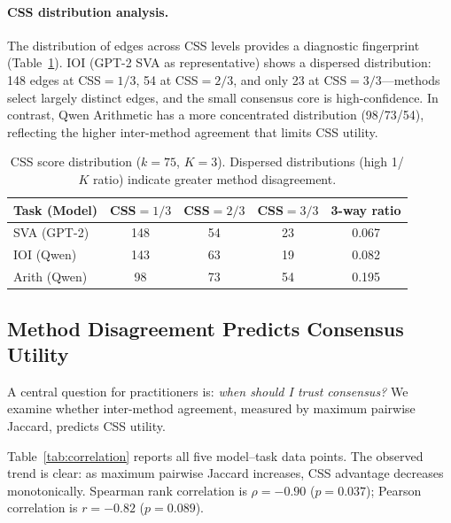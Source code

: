 \documentclass[11pt,a4paper]{article}
\newcommand{\css}{\textsc{CSS}}
\begin{document}
\paragraph{CSS distribution analysis.}
The distribution of edges across \css{} levels provides a diagnostic fingerprint (Table~\ref{tab:css_dist}).
IOI (GPT-2 SVA as representative) shows a dispersed distribution: 148 edges at \css{}$=1/3$, 54 at \css{}$=2/3$, and only 23 at \css{}$=3/3$---methods select largely distinct edges, and the small consensus core is high-confidence.
In contrast, Qwen Arithmetic has a more concentrated distribution (98/73/54), reflecting the higher inter-method agreement that limits \css{} utility.

\begin{table}[t]
\centering
\small
\caption{\css{} score distribution ($k\!=\!75$, $K\!=\!3$). Dispersed distributions (high 1/$K$ ratio) indicate greater method disagreement.}
\label{tab:css_dist}
\begin{tabular}{@{}lcccc@{}}
\toprule
Task (Model) & \css{}$=1/3$ & \css{}$=2/3$ & \css{}$=3/3$ & 3-way ratio \\
\midrule
SVA (GPT-2) & 148 & 54 & 23 & 0.067 \\
IOI (Qwen) & 143 & 63 & 19 & 0.082 \\
Arith (Qwen) & 98 & 73 & 54 & 0.195 \\
\bottomrule
\end{tabular}
\end{table}

\subsection{Method Disagreement Predicts Consensus Utility}
\label{sec:jaccard}

A central question for practitioners is: \emph{when should I trust consensus?}
We examine whether inter-method agreement, measured by maximum pairwise Jaccard, predicts \css{} utility.

Table~\ref{tab:correlation} reports all five model--task data points.
The observed trend is clear: as maximum pairwise Jaccard increases, \css{} advantage decreases monotonically.
Spearman rank correlation is $\rho = -0.90$ ($p = 0.037$); Pearson correlation is $r = -0.82$ ($p = 0.089$).
\end{document}
